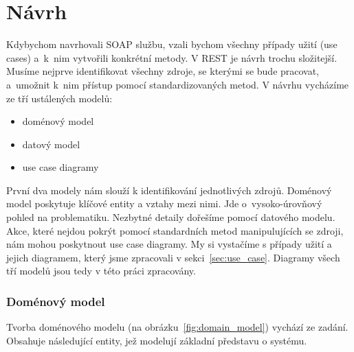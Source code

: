 \chapter{Návrh}

Kdybychom navrhovali SOAP službu, vzali bychom všechny případy užití (use cases) a~k~nim vytvořili
konkrétní metody. V REST je návrh trochu složitejší.
Musíme nejprve identifikovat všechny zdroje, se kterými se bude pracovat, a~umožnit
k~nim přístup pomocí standardizovaných metod. V návrhu vycházíme ze tří ustálených modelů:

\begin{itemize}
\item doménový model
\item datový model
\item use case diagramy
\end{itemize}

První dva modely nám slouží k identifikování jednotlivých zdrojů.
Doménový model poskytuje klíčové entity a vztahy mezi nimi.
Jde o~vysoko-úrovňový pohled na problematiku. Nezbytné detaily dořešíme pomocí datového modelu. 
Akce, které nejdou pokrýt pomocí standardních metod manipulujících se zdroji, nám mohou poskytnout use case diagramy.
My si vystačíme s případy užití a jejich diagramem, který jsme zpracovali v sekci~\ref{sec:use_case}. 
Diagramy všech tří modelů jsou tedy v této práci zpracovány.

\subsection{Doménový model}

Tvorba doménového modelu (na obrázku~\ref{fig:domain_model}) vychází ze zadání. Obsahuje následující entity,
jež modelují základní představu o systému.

